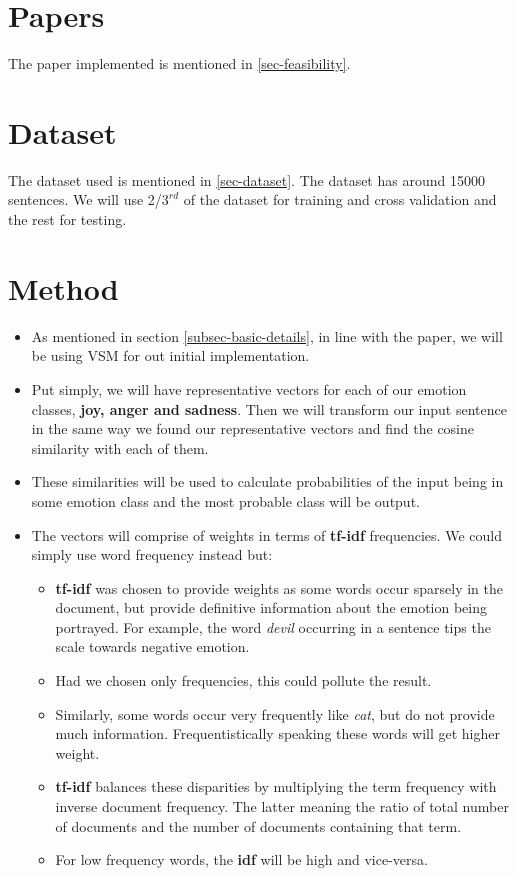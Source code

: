 \section{Papers}
The paper implemented is mentioned in \ref{sec-feasibility}.
\section{Dataset}
The dataset used is mentioned in \ref{sec-dataset}. The dataset has around 15000 sentences. We will use 2/$3^{rd}$ of the dataset for training and cross validation and the rest for testing.
\section{Method}
\begin{itemize}
\item As mentioned in section \ref{subsec-basic-details}, in line with the paper, we will be using VSM for out initial implementation.
\item Put simply, we will have representative vectors for each of our emotion classes, \textbf{joy, anger and sadness}. Then we will transform our input sentence in the same way we found our representative vectors and find the cosine similarity with each of them.
\item These similarities will be used to calculate probabilities of the input being in some emotion class and the most probable class will be output.
\item The vectors will comprise of weights in terms of \textbf{tf-idf} frequencies. We could simply use word frequency instead but:
	\begin{itemize}
		\item \textbf{tf-idf} was chosen to provide weights as some words occur sparsely in the document, but provide definitive information about the emotion being portrayed. For example, the word \emph{devil} occurring in a sentence tips the scale towards negative emotion.
		\item Had we chosen only frequencies, this could pollute the result.
		\item Similarly, some words occur very frequently like \emph{cat}, but do not provide much information. Frequentistically speaking these words will get higher weight.
		\item \textbf{tf-idf} balances these disparities by multiplying the term frequency with inverse document frequency. The latter meaning the ratio of total number of documents and the number of documents containing that term.
		\item For low frequency words, the \textbf{idf} will be high and vice-versa.
	\end{itemize}
\end{itemize}
